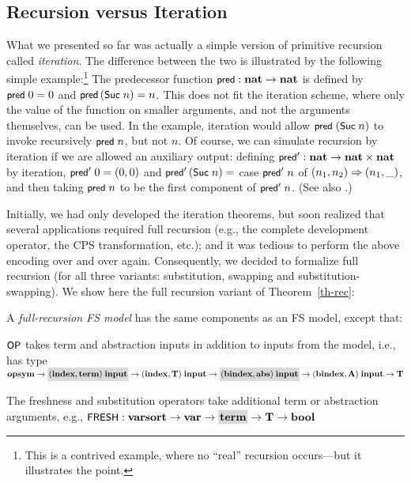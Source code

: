 \subsection{Recursion versus Iteration}

What we presented so far was actually a simple version of primitive recursion 
called {\em iteration}. The difference between the two is illustrated by 
the following simple example:\footnote{This is a contrived example, where no ``real'' recursion 
occurs---but 
it illustrates the point.} 
The predecessor function $\mbox{\rm\textsf{\small pred}} : \mbox{\bf nat} \rightarrow \mbox{\bf nat}$ 
is defined by $\mbox{\rm\textsf{\small pred}}\;0 = 0$ and $\mbox{\rm\textsf{\small pred}}\,(\mbox{\rm\textsf{\small Suc}}\;n) = n$.  
This does not fit the iteration scheme, where only the value of the function on 
smaller arguments, and not the arguments themselves, can be used. 
In the example, iteration would allow 
$\mbox{\rm\textsf{\small pred}}\;(\mbox{\rm\textsf{\small Suc}}\;n)$ to invoke recursively $\mbox{\rm\textsf{\small pred}}\;n$, but not $n$.  
Of course, we can simulate recursion by iteration if we are allowed an auxiliary 
output: defining $\mbox{\rm\textsf{\small pred}}' : \mbox{\bf nat}  \rightarrow \mbox{\bf nat} \times \mbox{\bf nat}$ by iteration, 
$\mbox{\rm\textsf{\small pred}}'\;0 = (0,0)$ and $\mbox{\rm\textsf{\small pred}}'\,(\mbox{\rm\textsf{\small Suc}}\;n) = $ case $\mbox{\rm\textsf{\small pred}}'\;n$ of $(n_1,n_2) \Rightarrow (n_1,\_)$, 
and then taking $\mbox{\rm\textsf{\small pred}}\;n$ to be the first component of $\mbox{\rm\textsf{\small pred}}'\;n$. 
(See also \cite[\S1.4.2]{pop-thesis}.) 

Initially, we had only developed the iteration theorems, but soon realized that 
several applications required full recursion (e.g., the complete development 
operator, the CPS transformation, etc.); and it was tedious to perform the above 
encoding over and over again. Consequently, we decided to formalize full recursion 
(for all three variants: substitution, swapping and substitution-swapping).  
We show here the full recursion variant of Theorem~\ref{th-rec}: 

A {\em full-recursion FS model} has the same components as an FS model, 
except that:
\begin{myitem}
\item $\mbox{\rm\textsf{\small OP}}$ takes term and abstraction inputs in addition to inputs from the model, i.e., 
has type $\opsym \ra \coll{(\indexx,\term)\;\inputt} \ra (\indexx,\T)\;\inputt 
\ra 
\coll{(\bindexx,\abs)\;\inputt} \allowbreak \ra 
(\bindexx,\A)\;\inputt \ra \T$
\item The freshness and substitution operators take additional term or abstraction arguments, 
e.g., $\FRESH : \varsort \ra \var \ra \coll{\term} \ra \T \ra \bool$
\end{myitem}


